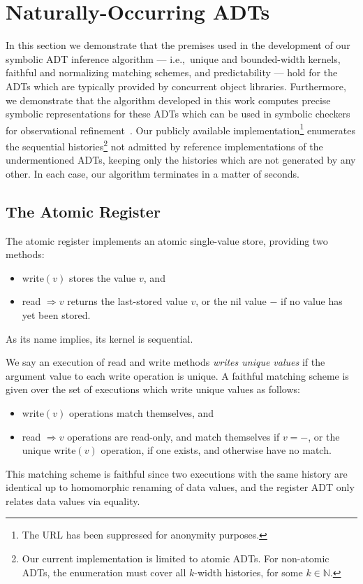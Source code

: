 \section{Naturally-Occurring ADTs}
\label{sec:nature}

In this section we demonstrate that the premises used in the development of our
symbolic ADT inference algorithm — i.e.,~unique and bounded-width kernels,
faithful and normalizing matching schemes, and predictability — hold for the
ADTs which are typically provided by concurrent object libraries. Furthermore,
we demonstrate that the algorithm developed in this work computes precise
symbolic representations for these ADTs which can be used in symbolic checkers
for observational refinement~\cite{conf/pldi/EmmiEH15}. Our publicly available
implementation\footnote{The URL has been suppressed for anonymity purposes.}
enumerates the sequential histories\footnote{Our current implementation is
limited to atomic ADTs. For non-atomic ADTs, the enumeration must cover all
$k$-width histories, for some $k \in \mathbb{N}$.} not admitted by reference
implementations of the undermentioned ADTs, keeping only the histories which
are not generated by any other. In each case, our algorithm terminates in a
matter of seconds.

\subsection{The Atomic Register}

The atomic register implements an atomic single-value store, providing two
methods:
\begin{itemize}

  \item write$(v)$ stores the value $v$, and

  \item read $\Rightarrow v$ returns the last-stored value $v$, or the nil
  value $-$ if no value has yet been stored.

\end{itemize}
As its name implies, its kernel is sequential.

We say an execution of read and write methods \emph{writes unique values} if
the argument value to each write operation is unique. A faithful matching
scheme is given over the set of executions which write unique values as follows:
\begin{itemize}

  \item write$(v)$ operations match themselves, and

  \item read $\Rightarrow v$ operations are read-only, and match themselves if
  $v = -$, or the unique write$(v)$ operation, if one exists, and otherwise
  have no match.

\end{itemize}
This matching scheme is faithful since two executions with the same history
are identical up to homomorphic renaming of data values, and the register ADT
only relates data values via equality.

